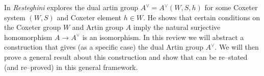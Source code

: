 In \cite{resteghini_free_2024} \emph{Resteghini} explores the dual artin group $A^\vee = A^\vee(W,S,h)$ for some Coxeter system $(W,S)$ and Coxeter element $h \in W$.
He shows that certain conditions on the Coxeter group $W$ and Artin group $A$ imply the natural surjective homomorphism $A \to A^\vee$ is an isomorphism.
In this review we will abstract a construction that gives (as a specific case) the dual Artin group $A^\vee$.
We will then prove a general result about this construction and show that \cite[Proposition 3.9]{resteghini_free_2024} can be re--stated (and re--proved) in this general framework.

